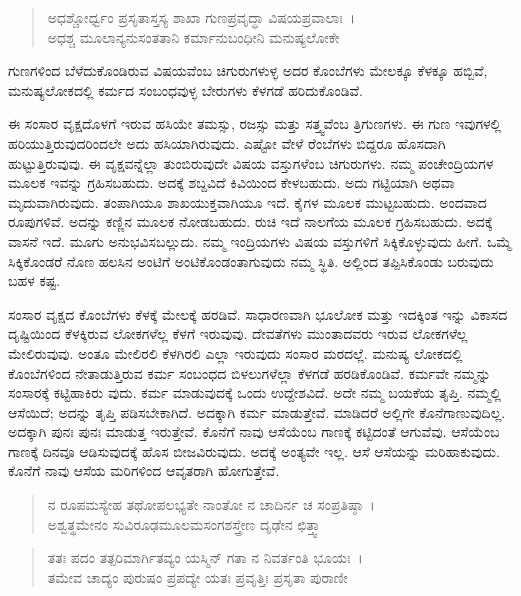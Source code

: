 \begin{verse}
ಅಧಶ್ಚೋರ್ಧ್ವಂ ಪ್ರಸೃತಾಸ್ತಸ್ಯ ಶಾಖಾ ಗುಣಪ್ರವೃದ್ಧಾ ವಿಷಯಪ್ರವಾಲಾಃ~।\\ಅಧಶ್ಚ ಮೂಲಾನ್ಯನುಸಂತತಾನಿ ಕರ್ಮಾನುಬಂಧೀನಿ ಮನುಷ್ಯಲೋಕೇ 
\end{verse}

{\small ಗುಣಗಳಿಂದ ಬೆಳೆದುಕೊಂಡಿರುವ ವಿಷಯವೆಂಬ ಚಿಗುರುಗಳುಳ್ಳ ಅದರ ಕೊಂಬೆಗಳು ಮೇಲಕ್ಕೂ ಕೆಳಕ್ಕೂ ಹಬ್ಬಿವೆ, ಮನುಷ್ಯಲೋಕದಲ್ಲಿ ಕರ್ಮದ ಸಂಬಂಧವುಳ್ಳ ಬೇರುಗಳು ಕೆಳಗಡೆ ಹರಿದುಕೊಂಡಿವೆ.}

ಈ ಸಂಸಾರ ವೃಕ್ಷದೊಳಗೆ ಇರುವ ಹಸಿಯೇ ತಮಸ್ಸು, ರಜಸ್ಸು ಮತ್ತು ಸತ್ತ್ವವೆಂಬ ತ್ರಿಗುಣಗಳು. ಈ ಗುಣ ಇವುಗಳಲ್ಲಿ ಹರಿಯುತ್ತಿರುವುದರಿಂದಲೇ ಅದು ಹಸಿಯಾಗಿರುವುದು. ಎಷ್ಟೋ ವೇಳೆ ರೆಂಬೆಗಳು ಬಿದ್ದರೂ ಹೊಸದಾಗಿ ಹುಟ್ಟುತ್ತಿರುವುವು. ಈ ವೃಕ್ಷವನ್ನೆಲ್ಲಾ ತುಂಬಿರುವುದೇ ವಿಷಯ ವಸ್ತುಗಳೆಂಬ ಚಿಗುರುಗಳು. ನಮ್ಮ ಪಂಚೇಂದ್ರಿಯಗಳ ಮೂಲಕ ಇವನ್ನು ಗ್ರಹಿಸಬಹುದು. ಅದಕ್ಕೆ ಶಬ್ದವಿದೆ ಕಿವಿಯಿಂದ ಕೇಳಬಹುದು. ಅದು ಗಟ್ಟಿಯಾಗಿ ಅಥವಾ ಮೃದುವಾಗಿರುವುದು. ತಂಪಾಗಿಯೂ ಶಾಖಯುಕ್ತವಾಗಿಯೂ ಇದೆ. ಕೈಗಳ ಮೂಲಕ ಮುಟ್ಟಬಹುದು. ಅಂದವಾದ ರೂಪುಗಳಿವೆ. ಅದನ್ನು ಕಣ್ಣಿನ ಮೂಲಕ ನೋಡಬಹುದು. ರುಚಿ ಇದೆ ನಾಲಗೆಯ ಮೂಲಕ ಗ್ರಹಿಸಬಹುದು. ಅದಕ್ಕೆ ವಾಸನೆ ಇದೆ. ಮೂಗು ಅನುಭವಿಸಬಲ್ಲುದು. ನಮ್ಮ ಇಂದ್ರಿಯಗಳು ವಿಷಯ ವಸ್ತುಗಳಿಗೆ ಸಿಕ್ಕಿಕೊಳ್ಳುವುದು ಹೀಗೆ. ಒಮ್ಮೆ ಸಿಕ್ಕಿಕೊಂಡರೆ ನೊಣ ಹಲಸಿನ ಅಂಟಿಗೆ ಅಂಟಿಕೊಂಡಂತಾಗುವುದು ನಮ್ಮ ಸ್ಥಿತಿ. ಅಲ್ಲಿಂದ ತಪ್ಪಿಸಿಕೊಂಡು ಬರುವುದು ಬಹಳ ಕಷ್ಟ.

ಸಂಸಾರ ವೃಕ್ಷದ ಕೊಂಬೆಗಳು ಕೆಳಕ್ಕೆ ಮೇಲಕ್ಕೆ ಹರಡಿವೆ. ಸಾಧಾರಣವಾಗಿ ಭೂಲೋಕ ಮತ್ತು ಇದಕ್ಕಿಂತ ಇನ್ನು ವಿಕಾಸದ ದೃಷ್ಟಿಯಿಂದ ಕೆಳಕ್ಕಿರುವ ಲೋಕಗಳೆಲ್ಲ ಕೆಳಗೆ ಇರುವುವು. ದೇವತೆಗಳು ಮುಂತಾದವರು ಇರುವ ಲೋಕಗಳೆಲ್ಲ ಮೇಲಿರುವುವು. ಅಂತೂ ಮೇಲಿರಲಿ ಕೆಳಗಿರಲಿ ಎಲ್ಲಾ ಇರುವುದು ಸಂಸಾರ ಮರದಲ್ಲೆ. ಮನುಷ್ಯ ಲೋಕದಲ್ಲಿ ಕೊಂಬೆಗಳಿಂದ ನೇತಾಡುತ್ತಿರುವ ಕರ್ಮ ಸಂಬಂಧದ ಬಿಳಲುಗಳೆಲ್ಲಾ ಕೆಳಗಡೆ ಹರಡಿಕೊಂಡಿವೆ. ಕರ್ಮವೇ ನಮ್ಮನ್ನು ಸಂಸಾರಕ್ಕೆ ಕಟ್ಟಿಹಾಕಿರು ವುದು. ಕರ್ಮ ಮಾಡುವುದಕ್ಕೆ ಒಂದು ಉದ್ದೇಶವಿದೆ. ಅದೇ ನಮ್ಮ ಬಯಕೆಯ ತೃಪ್ತಿ. ನಮ್ಮಲ್ಲಿ ಆಸೆಯಿದೆ; ಅದನ್ನು ತೃಪ್ತಿ ಪಡಿಸಬೇಕಾಗಿದೆ. ಅದಕ್ಕಾಗಿ ಕರ್ಮ ಮಾಡುತ್ತೇವೆ. ಮಾಡಿದರೆ ಅಲ್ಲಿಗೇ ಕೊನೆಗಾಣುವುದಿಲ್ಲ. ಅದಕ್ಕಾಗಿ ಪುನಃ ಪುನಃ ಮಾಡುತ್ತ ಇರುತ್ತೇವೆ. ಕೊನೆಗೆ ನಾವು ಆಸೆಯೆಂಬ ಗಾಣಕ್ಕೆ ಕಟ್ಟಿದಂತೆ ಆಗುವೆವು. ಆಸೆಯೆಂಬ ಗಾಣಕ್ಕೆ ದಿನವೂ ಆಡಿಸುವುದಕ್ಕೆ ಹೊಸ ಬೀಜವಿರುವುದು. ಅದಕ್ಕೆ ಅಂತ್ಯವೇ ಇಲ್ಲ. ಆಸೆ ಆಸೆಯನ್ನು ಮರಿಹಾಕುವುದು. ಕೊನೆಗೆ ನಾವು ಆಸೆಯ ಮರಿಗಳಿಂದ ಆವೃತರಾಗಿ ಹೋಗುತ್ತೇವೆ.

\begin{verse}
ನ ರೂಪಮಸ್ಯೇಹ ತಥೋಪಲಭ್ಯತೇ ನಾಂತೋ ನ ಚಾದಿರ್ನ ಚ ಸಂಪ್ರತಿಷ್ಠಾ~।\\ಅಶ್ವತ್ಥಮೇನಂ ಸುವಿರೂಢಮೂಲಮಸಂಗಶಸ್ತ್ರೇಣ ದೃಢೇನ ಛಿತ್ತ್ವಾ 
\end{verse}

\begin{verse}
ತತಃ ಪದಂ ತತ್ಪರಿಮಾರ್ಗಿತವ್ಯಂ ಯಸ್ಮಿನ್ ಗತಾ ನ ನಿವರ್ತಂತಿ ಭೂಯಃ~।\\ತಮೇವ ಚಾದ್ಯಂ ಪುರುಷಂ ಪ್ರಪದ್ಯೇ ಯತಃ ಪ್ರವೃತ್ತಿಃ ಪ್ರಸೃತಾ ಪುರಾಣೀ 
\end{verse}

